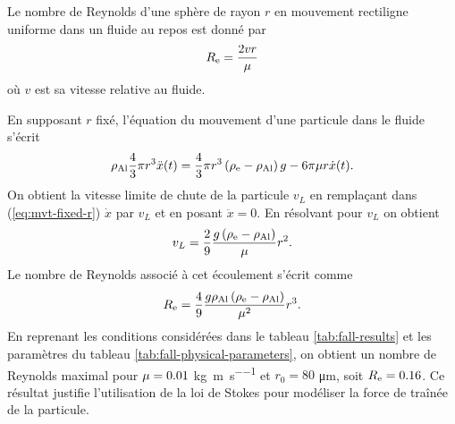 \begin{remarque}
  Le nombre de Reynolds d'une sphère de rayon $r$ en mouvement
  rectiligne uniforme dans un fluide au repos est donné par
  \begin{equation}
    R_{\mathrm e} = \frac{2 v r}{\mu}
  \end{equation}
  où $v$ est sa vitesse relative au fluide.

  En supposant $r$ fixé, l'équation du mouvement d'une particule
  dans le fluide s'écrit
  \begin{equation}\label{eq:mvt-fixed-r}
    \rho_\mathrm{Al} \frac{4}{3}\pi r^3 \ddot x(t) = \frac{4}{3}\pi r^3\left( \rho_\mathrm{e} - \rho_\mathrm{Al} \right)g -
  6\pi\mu r\dot x(t).
  \end{equation}
  On obtient la vitesse limite de chute de la particule $v_L$ en
  remplaçant dans (\ref{eq:mvt-fixed-r}) $\dot x$ par $v_L$ et en posant $\ddot x
  = 0$. En résolvant pour $v_L$ on obtient
  \begin{equation}
    v_L = \frac{2}{9}\frac{g\left( \rho_\mathrm{e} - \rho_\mathrm{Al} \right)}{\mu}r^2.
  \end{equation}
  Le nombre de Reynolds associé à cet écoulement s'écrit comme
  \begin{equation}
    R_{\mathrm e} = \frac{4}{9}\frac{g\rho_\mathrm{Al}\left( \rho_\mathrm{e} - \rho_\mathrm{Al} \right)}{\mu^2}r^3.
  \end{equation}
  En reprenant les conditions considérées dans le tableau
  \ref{tab:fall-results} et les paramètres du tableau
  \ref{tab:fall-physical-parameters}, on obtient un nombre de Reynolds
  maximal pour $\mu = 0.01$
  \si{\kilo\gram\per\meter\per\second} et $r_0 = 80$
  \si{\micro\meter}, soit $R_{\mathrm e} = 0.16$. Ce résultat justifie
  l'utilisation de la loi de Stokes pour modéliser la force de traînée
  de la particule.
\end{remarque}
